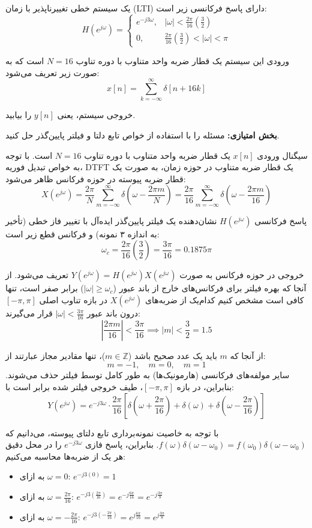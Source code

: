 یک سیستم خطی تغییرناپذیر با زمان (LTI) دارای پاسخ فرکانسی زیر است:
\[
H(e^{j\omega}) = \begin{cases} 
e^{-j3\omega}, & |\omega| < \frac{2\pi}{16} \left(\frac{3}{2}\right) \\ 
0, & \frac{2\pi}{16}\left(\frac{3}{2}\right) < |\omega| < \pi 
\end{cases}
\]

ورودی این سیستم یک قطار ضربه واحد متناوب با دوره تناوب $N=16$ است که به صورت زیر تعریف می‌شود:
\[
x[n] = \sum_{k=-\infty}^{\infty} \delta[n + 16k]
\]

خروجی سیستم، یعنی $y[n]$ را بیابید.

\textbf{بخش امتیازی:} مسئله را با استفاده از خواص تابع دلتا و فیلتر پایین‌گذر حل کنید.


سیگنال ورودی $x[n]$ یک قطار ضربه واحد متناوب با دوره تناوب $N = 16$ است. با توجه به خواص تبدیل فوریه، DTFT یک قطار ضربه متناوب در حوزه زمان، به صورت یک قطار ضربه پیوسته در حوزه فرکانس ظاهر می‌شود:
\[
X(e^{j\omega}) = \frac{2\pi}{N} \sum_{m=-\infty}^{\infty} \delta\left(\omega - \frac{2\pi m}{N}\right) = \frac{2\pi}{16} \sum_{m=-\infty}^{\infty} \delta\left(\omega - \frac{2\pi m}{16}\right)
\]

پاسخ فرکانسی $H(e^{j\omega})$ نشان‌دهنده یک فیلتر پایین‌گذر ایده‌آل با تغییر فاز خطی (تأخیر به اندازه ۳ نمونه) و فرکانس قطع زیر است:
\[
\omega_c = \frac{2\pi}{16} \left(\frac{3}{2}\right) = \frac{3\pi}{16} = 0.1875\pi
\]

خروجی در حوزه فرکانس به صورت $Y(e^{j\omega}) = H(e^{j\omega}) X(e^{j\omega})$ تعریف می‌شود. از آنجا که بهره فیلتر برای فرکانس‌های خارج از باند عبور ($|\omega| \ge \omega_c$) برابر صفر است، تنها کافی است مشخص کنیم کدام‌یک از ضربه‌های $X(e^{j\omega})$ در بازه تناوب اصلی $[-\pi, \pi]$ درون باند عبور $|\omega| < \frac{3\pi}{16}$ قرار می‌گیرند:
\[
\left| \frac{2\pi m}{16} \right| < \frac{3\pi}{16} \implies |m| < \frac{3}{2} = 1.5
\]

از آنجا که $m$ باید یک عدد صحیح باشد ($m \in \mathbb{Z}$)، تنها مقادیر مجاز عبارتند از:
\[
m = -1, \quad m = 0, \quad m = 1
\]
سایر مولفه‌های فرکانسی (هارمونیک‌ها) به طور کامل توسط فیلتر حذف می‌شوند. بنابراین، در بازه $[-\pi, \pi]$، طیف خروجی فیلتر شده برابر است با:
\[
Y(e^{j\omega}) = e^{-j3\omega} \cdot \frac{2\pi}{16} \left[ \delta\left(\omega + \frac{2\pi}{16}\right) + \delta(\omega) + \delta\left(\omega - \frac{2\pi}{16}\right) \right]
\]

با توجه به خاصیت نمونه‌برداری تابع دلتای پیوسته، می‌دانیم که $f(\omega)\delta(\omega - \omega_0) = f(\omega_0)\delta(\omega - \omega_0)$. بنابراین، پاسخ فازی $e^{-j3\omega}$ را در محل دقیق هر یک از ضربه‌ها محاسبه می‌کنیم:
\begin{itemize}
    \item به ازای $\omega = 0$: \quad $e^{-j3(0)} = 1$
    \item به ازای $\omega = \frac{2\pi}{16}$: \quad $e^{-j3\left(\frac{2\pi}{16}\right)} = e^{-j\frac{6\pi}{16}} = e^{-j\frac{3\pi}{8}}$
    \item به ازای $\omega = -\frac{2\pi}{16}$: \quad $e^{-j3\left(-\frac{2\pi}{16}\right)} = e^{j\frac{6\pi}{16}} = e^{j\frac{3\pi}{8}}$
\end{itemize}

